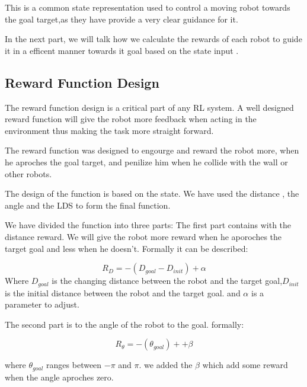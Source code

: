 \documentclass[12pt]{extarticle}
\begin{document}
This is a common state representation used  to control a moving robot towards the goal target,as they have provide a very clear guidance for it. 
\cite{quiroga2022position} \cite{gong2022efficient}

In the next part, we will talk how we calculate the rewards of each robot to guide it in a efficent manner  towards it goal based on the state input  .
 



\pagebreak

\subsection{Reward Function Design}

The reward function design is a critical part of any RL system. A well designed reward function will give the  robot more feedback when acting in the environment thus making the task more straight forward.

The reward function was designed to engourge and reward the robot  more, when he  aproches the goal target, and penilize him when he collide with the wall or other robots.

The design of the function is based on the state. We have used the distance , the  angle and the LDS to form the final function.

We have   divided  the function into three parts:
The first part contains with the distance reward. We will give the robot more reward when he aporoches the target goal and less when he doesn't. Formally
it can be described:
   
\setcounter{equation}{0}

       \begin{equation} \label{dist_r}
     R_{D}=-(D_{goal}-D_{init})+\alpha
   \end{equation}
    Where $D_{goal}$  is the changing distance between the robot and the target goal,${D_{init}}$ is the initial distance between the robot and the target goal. and $\alpha$ is a parameter to adjust.
    
The second part is to the angle of the robot to the goal. formally:



     \begin{equation} \label{angle_r}
     R_{\theta}=-(\theta_{goal})+ + \beta
   \end{equation}
 
 where $\theta_{goal}$  ranges  between $-\pi$  and $\pi$. we added the $\beta$ which add some reward when the  angle aproches zero.
  
\end{document}
